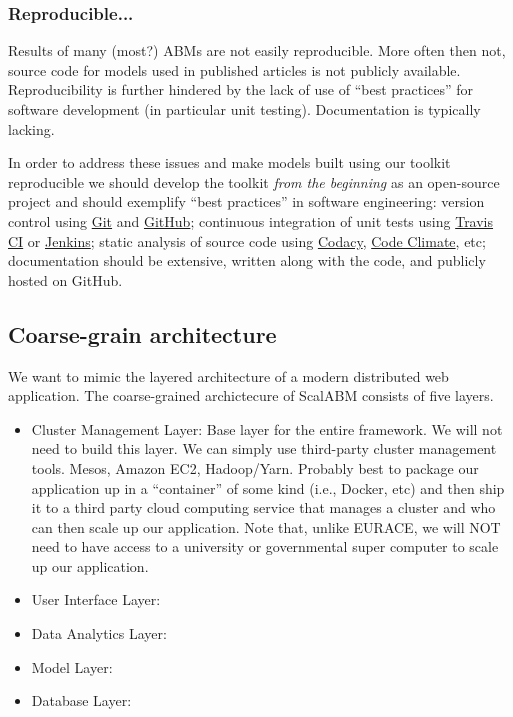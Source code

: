\documentclass[11pt]{amsart}
\begin{document}
\subsubsection{Reproducible...}
Results of many (most?) ABMs are not easily reproducible. More often then not, source code for models used in published articles is not publicly available. Reproducibility is further hindered by the lack of use of ``best practices'' for software development (in particular unit testing). Documentation is typically lacking. 

In order to address these issues and make models built using our toolkit reproducible we should develop the toolkit \textit{from the beginning} as an open-source project and should exemplify ``best practices'' in software engineering: version control using \href{https://git-scm.com/}{Git} and \href{https://github.com/}{GitHub}; continuous integration of unit tests using \href{https://travis-ci.org/}{Travis CI} or \href{https://jenkins-ci.org/}{Jenkins}; static analysis of source code using \href{https://www.codacy.com/login}{Codacy}, \href{https://codeclimate.com/}{Code Climate}, etc; documentation should be extensive, written along with the code, and publicly hosted on GitHub.   

\subsection{Coarse-grain architecture}
We want to mimic the layered architecture of a modern distributed web application.  The coarse-grained archictecure of ScalABM consists of five layers.
\begin{itemize}
    \item Cluster Management Layer: Base layer for the entire framework. We will not need to build this layer. We can simply use third-party cluster management tools. Mesos, Amazon EC2, Hadoop/Yarn.  Probably best to package our application up in a ``container'' of some kind (i.e., Docker, etc) and then ship it to a third party cloud computing service that manages a cluster and who can then scale up our application.  Note that, unlike EURACE, we will NOT need to have access to a university or governmental super computer to scale up our application.
    \item User Interface Layer:
    \item Data Analytics Layer:
    \item Model Layer:
    \item Database Layer:
\end{itemize}
\end{document}
